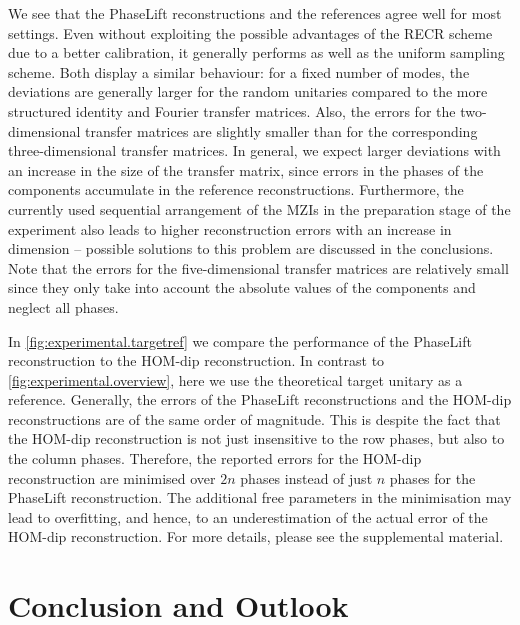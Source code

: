We see that the PhaseLift reconstructions and the references agree well for most settings.
Even without exploiting the possible advantages of the RECR scheme due to a better calibration, it generally performs as well as the uniform sampling scheme.
Both display a similar behaviour: for a fixed number of modes, the deviations are generally larger for the random unitaries compared to the more structured identity and Fourier transfer matrices.
Also, the errors for the two-dimensional transfer matrices are slightly smaller than for the corresponding three-dimensional transfer matrices.
In general, we expect larger deviations with an increase in the size of the transfer matrix, since errors in the phases of the components accumulate in the reference reconstructions.
Furthermore, the currently used sequential arrangement of the MZIs in the preparation stage of the experiment also leads to higher reconstruction errors with an increase in dimension -- possible solutions to this problem are discussed in the conclusions.
Note that the errors for the five-dimensional transfer matrices are relatively small since they only take into account the absolute values of the components and neglect all phases.

In \cref{fig:experimental.targetref} we compare the performance of the PhaseLift reconstruction to the HOM-dip reconstruction.
In contrast to \cref{fig:experimental.overview}, here we use the theoretical target unitary as a reference.
Generally, the errors of the PhaseLift reconstructions and the HOM-dip reconstructions are of the same order of magnitude.
This is despite the fact that the HOM-dip reconstruction is not just insensitive to the row phases, but also to the column phases.
Therefore, the reported errors for the HOM-dip reconstruction are minimised over $2n$ phases instead of just $n$ phases for the PhaseLift reconstruction.
The additional free parameters in the minimisation may lead to overfitting, and hence, to an underestimation of the actual error of the HOM-dip reconstruction.
For more details, please see the supplemental material.


\section{Conclusion and Outlook}

